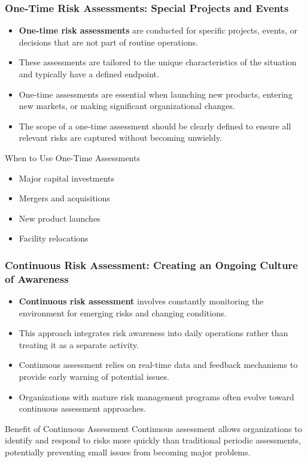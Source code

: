\documentclass{beamer}
\begin{document}
\begin{frame}
  \frametitle{One-Time Risk Assessments: Special Projects and Events}
  \begin{itemize}
    \item \textbf{One-time risk assessments} are conducted for specific projects, events, or decisions that are not part of routine operations.
    \item These assessments are tailored to the unique characteristics of the situation and typically have a defined endpoint.
    \item One-time assessments are essential when launching new products, entering new markets, or making significant organizational changes.
    \item The scope of a one-time assessment should be clearly defined to ensure all relevant risks are captured without becoming unwieldy.
  \end{itemize}
  
  \begin{block}{When to Use One-Time Assessments}
  \begin{itemize}
    \item Major capital investments
    \item Mergers and acquisitions
    \item New product launches
    \item Facility relocations
  \end{itemize}
  \end{block}
  \end{frame}
  
  \begin{frame}
  \frametitle{Continuous Risk Assessment: Creating an Ongoing Culture of Awareness}
  \begin{itemize}
    \item \textbf{Continuous risk assessment} involves constantly monitoring the environment for emerging risks and changing conditions.
    \item This approach integrates risk awareness into daily operations rather than treating it as a separate activity.
    \item Continuous assessment relies on real-time data and feedback mechanisms to provide early warning of potential issues.
    \item Organizations with mature risk management programs often evolve toward continuous assessment approaches.
  \end{itemize}
  
  \begin{alertblock}{Benefit of Continuous Assessment}
  Continuous assessment allows organizations to identify and respond to risks more quickly than traditional periodic assessments, potentially preventing small issues from becoming major problems.
  \end{alertblock}
  \end{frame}
  
\end{document}
